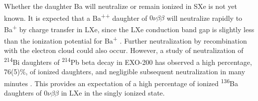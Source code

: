 Whether the daughter Ba will neutralize or remain ionized in SXe is not yet known.  It is expected that a Ba\textsuperscript{++} daughter of $0\nu\beta\beta$ will neutralize rapidly to Ba\textsuperscript{+} by charge transfer in LXe, since the LXe conduction band gap is slightly less than the ionization potential for Ba\textsuperscript{+} \cite{Moe1991}.  Further neutralization by recombination with the electron cloud could also occur.  However, a study of neutralization of \textsuperscript{214}Bi daughters of \textsuperscript{214}Pb beta decay in EXO-200 has observed a high percentage, 76(5)\%, of ionized daughters, and negligible subsequent neutralization in many minutes \cite{alphaion}.  This provides an expectation of a high percentage of ionized \textsuperscript{136}Ba daughters of $0\nu\beta\beta$ in LXe in the singly ionized state.


